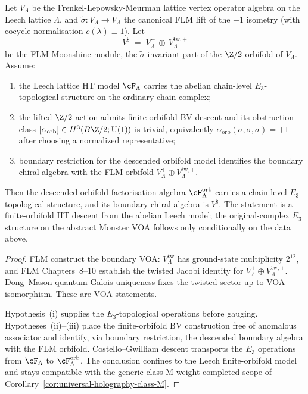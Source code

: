 \begin{theorem}
\label{thm:monster-chain-level-e3-top}
Let $V_\Lambda$ be the Frenkel-Lepowsky-Meurman lattice vertex
operator algebra on the Leech lattice $\Lambda$, and
$\widetilde{\sigma}\colon V_\Lambda \to V_\Lambda$ the canonical FLM
lift of the $-1$ isometry (with cocycle normalisation
$c(\lambda) \equiv 1$). Let
\[
 V^\natural
 \;=\; V_\Lambda^+
 \,\oplus\, V_\Lambda^{\mathrm{tw},+}
\]
be the FLM Moonshine module, the $\widetilde{\sigma}$-invariant part
of the $\Z/2$-orbifold of $V_\Lambda$. Assume:
\begin{enumerate}[label=\textup{(\roman*)}]
\item the Leech lattice HT model $\cF_\Lambda$ carries the abelian
chain-level $E_3$-topological structure on the ordinary chain complex;
\item the lifted $\Z/2$ action admits finite-orbifold BV descent and
its obstruction class
$[\alpha_{\mathrm{orb}}]\in H^3(B\Z/2;\mathrm{U}(1))$ is trivial,
equivalently
$\alpha_{\mathrm{orb}}(\sigma,\sigma,\sigma)=+1$ after choosing a
normalized representative;
\item boundary restriction for the descended orbifold model identifies
the boundary chiral algebra with the FLM orbifold
$V_\Lambda^+\oplus V_\Lambda^{\mathrm{tw},+}$.
\end{enumerate}
Then the descended orbifold factorisation algebra
$\cF_\Lambda^{\mathrm{orb}}$ carries a chain-level $E_3$-topological
structure, and its boundary chiral algebra is $V^\natural$. The
statement is a finite-orbifold HT descent from the abelian Leech model;
the original-complex $E_3$ structure on the abstract Monster VOA
follows only conditionally on the data above.
\end{theorem}

\begin{proof}
FLM construct the boundary VOA:
$V_\Lambda^{\mathrm{tw}}$ has ground-state multiplicity $2^{12}$, and
FLM Chapters~8--10 establish the twisted Jacobi identity for
$V_\Lambda^+\oplus V_\Lambda^{\mathrm{tw},+}$. Dong--Mason quantum
Galois uniqueness fixes the twisted sector up to VOA isomorphism.
These are VOA statements.

Hypothesis~(i) supplies the $E_3$-topological operations before
gauging. Hypotheses~(ii)--(iii) place the finite-orbifold BV
construction free of anomalous associator and identify, via boundary
restriction, the descended boundary algebra with the FLM orbifold.
Costello--Gwilliam descent transports the $E_3$ operations from
$\cF_\Lambda$ to $\cF_\Lambda^{\mathrm{orb}}$. The conclusion confines
to the Leech finite-orbifold model and stays compatible with the
generic class-M weight-completed scope of
Corollary~\ref*{cor:universal-holography-class-M}.
\end{proof}

